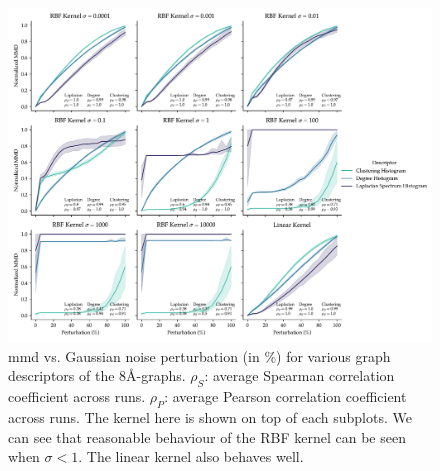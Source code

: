 \begin{figure}
  \centering
  \includegraphics[width=\textwidth]{./figures/results/res_1_2.pdf}
  \caption[Influence of kernel parameters on \acrshort{mmd} behaviour.]{\acrshort{mmd} vs. Gaussian
noise perturbation (in \%) for various graph descriptors of the
8\si{\angstrom}-graphs. $\rho_{S}$: average Spearman correlation coefficient
across runs. $\rho_{P}$: average Pearson correlation coefficient across runs.
The kernel here is shown on top of each subplots. We can see that reasonable
behaviour of the RBF kernel can be seen when $\sigma<1$. The linear kernel also
behaves well.}
  \label{fig:mmd_effect_kernel}
\end{figure}

